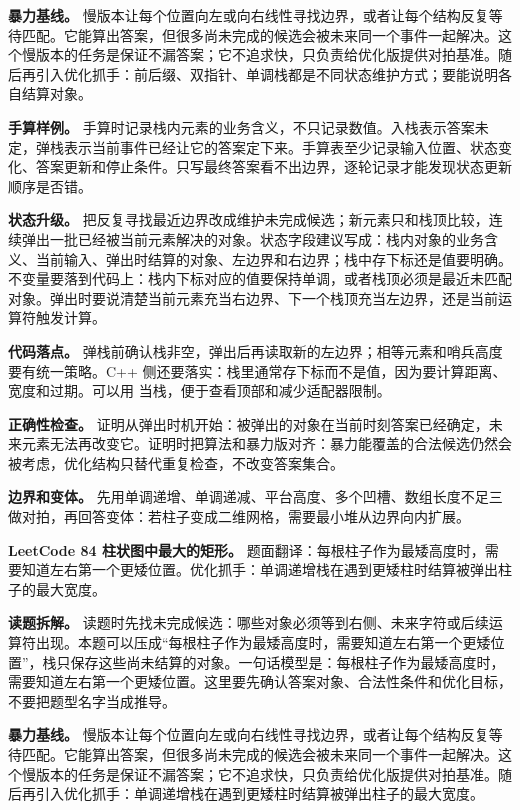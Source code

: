 \textbf{暴力基线。} 慢版本让每个位置向左或向右线性寻找边界，或者让每个结构反复等待匹配。它能算出答案，但很多尚未完成的候选会被未来同一个事件一起解决。这个慢版本的任务是保证不漏答案；它不追求快，只负责给优化版提供对拍基准。随后再引入优化抓手：前后缀、双指针、单调栈都是不同状态维护方式；要能说明各自结算对象。

\textbf{手算样例。} 手算时记录栈内元素的业务含义，不只记录数值。入栈表示答案未定，弹栈表示当前事件已经让它的答案定下来。手算表至少记录输入位置、状态变化、答案更新和停止条件。只写最终答案看不出边界，逐轮记录才能发现状态更新顺序是否错。

\textbf{状态升级。} 把反复寻找最近边界改成维护未完成候选；新元素只和栈顶比较，连续弹出一批已经被当前元素解决的对象。状态字段建议写成：栈内对象的业务含义、当前输入、弹出时结算的对象、左边界和右边界；栈中存下标还是值要明确。不变量要落到代码上：栈内下标对应的值要保持单调，或者栈顶必须是最近未匹配对象。弹出时要说清楚当前元素充当右边界、下一个栈顶充当左边界，还是当前运算符触发计算。

\textbf{代码落点。} 弹栈前确认栈非空，弹出后再读取新的左边界；相等元素和哨兵高度要有统一策略。C++ 侧还要落实：栈里通常存下标而不是值，因为要计算距离、宽度和过期。可以用  当栈，便于查看顶部和减少适配器限制。

\textbf{正确性检查。} 证明从弹出时机开始：被弹出的对象在当前时刻答案已经确定，未来元素无法再改变它。证明时把算法和暴力版对齐：暴力能覆盖的合法候选仍然会被考虑，优化结构只替代重复检查，不改变答案集合。

\textbf{边界和变体。} 先用单调递增、单调递减、平台高度、多个凹槽、数组长度不足三做对拍，再回答变体：若柱子变成二维网格，需要最小堆从边界向内扩展。

\noindent\textbf{LeetCode 84 柱状图中最大的矩形。} 题面翻译：每根柱子作为最矮高度时，需要知道左右第一个更矮位置。优化抓手：单调递增栈在遇到更矮柱时结算被弹出柱子的最大宽度。

\textbf{读题拆解。} 读题时先找未完成候选：哪些对象必须等到右侧、未来字符或后续运算符出现。本题可以压成“每根柱子作为最矮高度时，需要知道左右第一个更矮位置”，栈只保存这些尚未结算的对象。一句话模型是：每根柱子作为最矮高度时，需要知道左右第一个更矮位置。这里要先确认答案对象、合法性条件和优化目标，不要把题型名字当成推导。

\textbf{暴力基线。} 慢版本让每个位置向左或向右线性寻找边界，或者让每个结构反复等待匹配。它能算出答案，但很多尚未完成的候选会被未来同一个事件一起解决。这个慢版本的任务是保证不漏答案；它不追求快，只负责给优化版提供对拍基准。随后再引入优化抓手：单调递增栈在遇到更矮柱时结算被弹出柱子的最大宽度。

